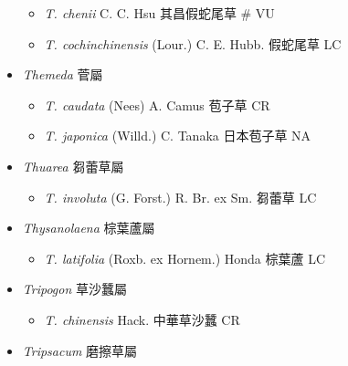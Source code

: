 \begin{itemize}
  \begin{itemize}
        \item[] \textit{T. chenii} C. C. Hsu  其昌假蛇尾草  \# VU
        \item[] \textit{T. cochinchinensis} (Lour.) C. E. Hubb.  假蛇尾草   LC
  \end{itemize}
 \item[] \textit{Themeda} 菅屬
                                
  \begin{itemize}
        \item[] \textit{T. caudata} (Nees) A. Camus  苞子草   CR
        \item[] \textit{T. japonica} (Willd.) C. Tanaka  日本苞子草   NA
  \end{itemize}
 \item[] \textit{Thuarea} 芻蕾草屬
                                
  \begin{itemize}
        \item[] \textit{T. involuta} (G. Forst.) R. Br. ex Sm.  芻蕾草   LC
  \end{itemize}
 \item[] \textit{Thysanolaena} 棕葉蘆屬
                                
  \begin{itemize}
        \item[] \textit{T. latifolia} (Roxb. ex Hornem.) Honda  棕葉蘆   LC
  \end{itemize}
 \item[] \textit{Tripogon} 草沙蠶屬
                                
  \begin{itemize}
        \item[] \textit{T. chinensis} Hack.  中華草沙蠶   CR
  \end{itemize}
 \item[] \textit{Tripsacum} 磨擦草屬
                                

\end{itemize}
